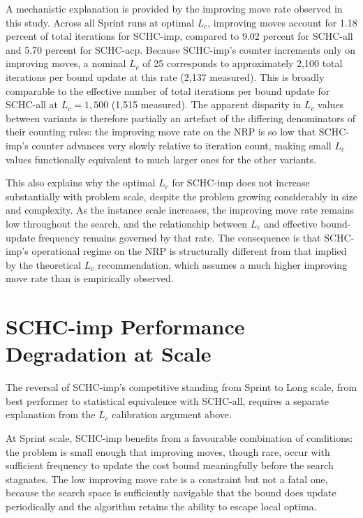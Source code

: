 \documentclass[12pt, a4paper, oneside]{report}
\begin{document}
A mechanistic explanation is provided by the improving move rate
observed in this study. Across all Sprint runs at optimal $L_c$, improving moves account for
1.18 percent of total iterations for SCHC-imp, compared to 9.02
percent for SCHC-all and 5.70 percent for SCHC-acp. Because
SCHC-imp's counter increments only on improving moves, a nominal
$L_c$ of 25 corresponds to approximately 2,100 total iterations per
bound update at this rate (2,137 measured). This is broadly
comparable to the effective number of total iterations per bound
update for SCHC-all at $L_c = 1{,}500$ (1,515 measured). The apparent disparity in $L_c$ values between
variants is therefore partially an artefact of the differing
denominators of their counting rules: the improving move rate on the
NRP is so low that SCHC-imp's counter advances very slowly relative
to iteration count, making small $L_c$ values functionally equivalent
to much larger ones for the other variants.

This also explains why the optimal $L_c$ for SCHC-imp does not
increase substantially with problem scale, despite the problem
growing considerably in size and complexity. As the instance scale
increases, the improving move rate remains low throughout the search,
and the relationship between $L_c$ and effective bound-update
frequency remains governed by that rate. The consequence is that
SCHC-imp's operational regime on the NRP is structurally different
from that implied by the theoretical $L_c$ recommendation, which
assumes a much higher improving move rate than is empirically
observed.

\section{SCHC-imp Performance Degradation at Scale}
\label{sec:disc_imp_degrade}

The reversal of SCHC-imp's competitive standing from Sprint to Long
scale, from best performer to statistical equivalence with SCHC-all,
requires a separate explanation from the $L_c$ calibration argument
above.

At Sprint scale, SCHC-imp benefits from a favourable combination of
conditions: the problem is small enough that improving moves, though
rare, occur with sufficient frequency to update the cost bound
meaningfully before the search stagnates. The low improving move rate
is a constraint but not a fatal one, because the search space is
sufficiently navigable that the bound does update periodically and
the algorithm retains the ability to escape local optima.
\end{document}
